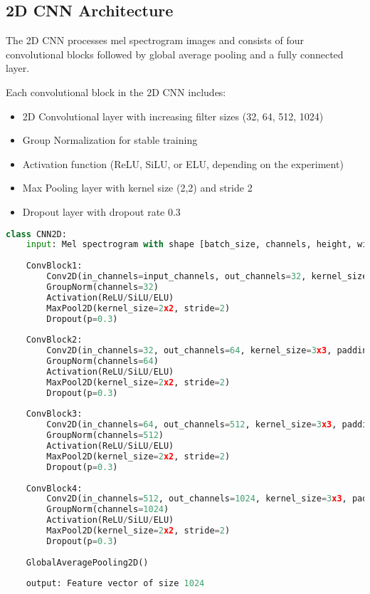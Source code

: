 \subsection{2D CNN Architecture}

The 2D CNN processes mel spectrogram images and consists of four convolutional blocks followed by global average pooling and a fully connected layer.

Each convolutional block in the 2D CNN includes:
\begin{itemize}
    \item 2D Convolutional layer with increasing filter sizes (32, 64, 512, 1024)
    \item Group Normalization for stable training
    \item Activation function (ReLU, SiLU, or ELU, depending on the experiment)
    \item Max Pooling layer with kernel size (2,2) and stride 2
    \item Dropout layer with dropout rate 0.3
\end{itemize}

\begin{lstlisting}[language=Python, style=pseudocode, caption=2D CNN Architecture (Pseudocode)]
class CNN2D:
    input: Mel spectrogram with shape [batch_size, channels, height, width]
    
    ConvBlock1:
        Conv2D(in_channels=input_channels, out_channels=32, kernel_size=3x3, padding=1)
        GroupNorm(channels=32)
        Activation(ReLU/SiLU/ELU)
        MaxPool2D(kernel_size=2x2, stride=2)
        Dropout(p=0.3)
    
    ConvBlock2:
        Conv2D(in_channels=32, out_channels=64, kernel_size=3x3, padding=1)
        GroupNorm(channels=64)
        Activation(ReLU/SiLU/ELU)
        MaxPool2D(kernel_size=2x2, stride=2)
        Dropout(p=0.3)
    
    ConvBlock3:
        Conv2D(in_channels=64, out_channels=512, kernel_size=3x3, padding=1)
        GroupNorm(channels=512)
        Activation(ReLU/SiLU/ELU)
        MaxPool2D(kernel_size=2x2, stride=2)
        Dropout(p=0.3)
    
    ConvBlock4:
        Conv2D(in_channels=512, out_channels=1024, kernel_size=3x3, padding=1)
        GroupNorm(channels=1024)
        Activation(ReLU/SiLU/ELU)
        MaxPool2D(kernel_size=2x2, stride=2)
        Dropout(p=0.3)
    
    GlobalAveragePooling2D()
    
    output: Feature vector of size 1024
\end{lstlisting}

